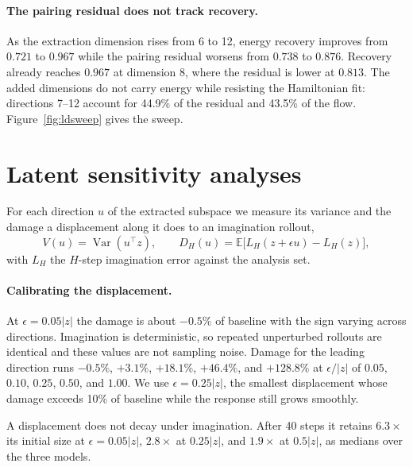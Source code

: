 \paragraph{The pairing residual does not track recovery.} As the extraction dimension rises from 6 to
12, energy recovery improves from $0.721$ to $0.967$ while the pairing residual worsens from $0.738$
to $0.876$. Recovery already reaches $0.967$ at dimension 8, where the residual is lower at $0.813$.
The added dimensions do not carry energy while resisting the Hamiltonian fit: directions 7--12
account for 44.9\% of the residual and 43.5\% of the flow. Figure~\ref{fig:ldsweep} gives the sweep.

\section{Latent sensitivity analyses}
\label{sec:sensitivity}

For each direction $u$ of the extracted subspace we measure its variance and the damage a
displacement along it does to an imagination rollout,
\begin{equation}
V(u) = \operatorname{Var}(u^\top z), \qquad
D_H(u) = \mathbb{E}\bigl[L_H(z+\epsilon u) - L_H(z)\bigr],
\label{eq:leverage}
\end{equation}
with $L_H$ the $H$-step imagination error against the analysis set.

\paragraph{Calibrating the displacement.} At $\epsilon = 0.05|z|$ the damage is about $-0.5\%$ of
baseline with the sign varying across directions. Imagination is deterministic, so repeated
unperturbed rollouts are identical and these values are not sampling noise. Damage for the leading
direction runs $-0.5\%$, $+3.1\%$, $+18.1\%$, $+46.4\%$, and $+128.8\%$ at $\epsilon/|z|$ of $0.05$,
$0.10$, $0.25$, $0.50$, and $1.00$. We use $\epsilon = 0.25|z|$, the smallest displacement whose
damage exceeds 10\% of baseline while the response still grows smoothly.

A displacement does not decay under imagination. After 40 steps it retains $6.3\times$ its initial
size at $\epsilon = 0.05|z|$, $2.8\times$ at $0.25|z|$, and $1.9\times$ at $0.5|z|$, as medians over
the three models.

